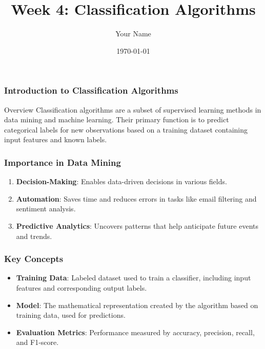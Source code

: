 \documentclass{beamer}
\title{Week 4: Classification Algorithms}
\author{Your Name}
\institute{Your Institution}
\date{\today}
\begin{document}
\frame{\titlepage}

\begin{frame}[fragile]
    \frametitle{Introduction to Classification Algorithms}
    \begin{block}{Overview}
        Classification algorithms are a subset of supervised learning methods in data mining and machine learning. Their primary function is to predict categorical labels for new observations based on a training dataset containing input features and known labels.
    \end{block}
\end{frame}

\begin{frame}[fragile]
    \frametitle{Importance in Data Mining}
    \begin{enumerate}
        \item \textbf{Decision-Making}: Enables data-driven decisions in various fields.
        \item \textbf{Automation}: Saves time and reduces errors in tasks like email filtering and sentiment analysis.
        \item \textbf{Predictive Analytics}: Uncovers patterns that help anticipate future events and trends.
    \end{enumerate}
\end{frame}

\begin{frame}[fragile]
    \frametitle{Key Concepts}
    \begin{itemize}
        \item \textbf{Training Data}: Labeled dataset used to train a classifier, including input features and corresponding output labels.
        \item \textbf{Model}: The mathematical representation created by the algorithm based on training data, used for predictions.
        \item \textbf{Evaluation Metrics}: Performance measured by accuracy, precision, recall, and F1-score.
    \end{itemize}
\end{frame}
\end{document}
